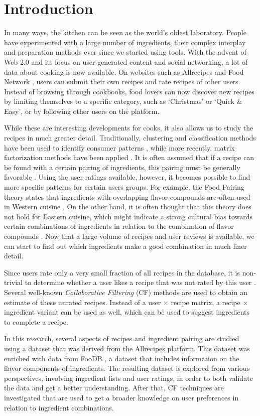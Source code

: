 \section{Introduction}
\label{sec:introduction}

In many ways, the kitchen can be seen as the world's oldest laboratory.
People have experimented with a large number of ingredients, their complex interplay and preparation methods ever since we started using tools.
With the advent of Web 2.0 and its focus on user-generated content and social networking, a lot of data about cooking is now available.
On websites such as Allrecipes \citep{Allrecipes} and Food Network \citep{FoodNetwork}, users can submit their own recipes and rate recipes of other users.
Instead of browsing through cookbooks, food lovers can now discover new recipes by limiting themselves to a specific category, such as `Christmas' or `Quick \& Easy', or by following other users on the platform.

While these are interesting developments for cooks, it also allows us to study the recipes in much greater detail.
Traditionally, clustering and classification methods have been used to identify consumer patterns \citep{Westad2004}, while more recently, matrix factorization methods have been applied \citep{Clercq2016}.
It is often assumed that if a recipe can be found with a certain pairing of ingredients, this pairing must be generally favorable \citep{Hart2004}.
Using the user ratings available, however, it becomes possible to find more specific patterns for certain users groups.
For example, the Food Pairing\textsuperscript{\textregistered} theory states that ingredients with overlapping flavor compounds are often used in Western cuisine \citep{FoodPairing}.
On the other hand, it is often thought that this theory does not hold for Eastern cuisine, which might indicate a strong cultural bias towards certain combinations of ingredients in relation to the combination of flavor compounds \citep{Ahn2011, Klepper2011}.
Now that a large volume of recipes and user reviews is available, we can start to find out which ingredients make a good combination in much finer detail.

Since users rate only a very small fraction of all recipes in the database, it is non-trivial to determine whether a user likes a recipe that was not rated by this user \citep{Ricci2010}.
Several well-known \emph{Collaborative Filtering} (CF) methods are used to obtain an estimate of these unrated recipes.
Instead of a user $\times$ recipe matrix, a recipe $\times$ ingredient variant can be used  as well, which can be used to suggest ingredients to complete a recipe.

In this research, several aspects of recipes and ingredient pairing are studied using a dataset that was derived from the Allrecipes platform.
This dataset was enriched with data from FooDB \citep{FooDB}, a dataset that includes information on the flavor components of ingredients.
The resulting dataset is explored from various perspectives, involving ingredient lists and user ratings, in order to both validate the data and get a better understanding.
After that, CF techniques are investigated that are used to get a broader knowledge on user preferences in relation to ingredient combinations.